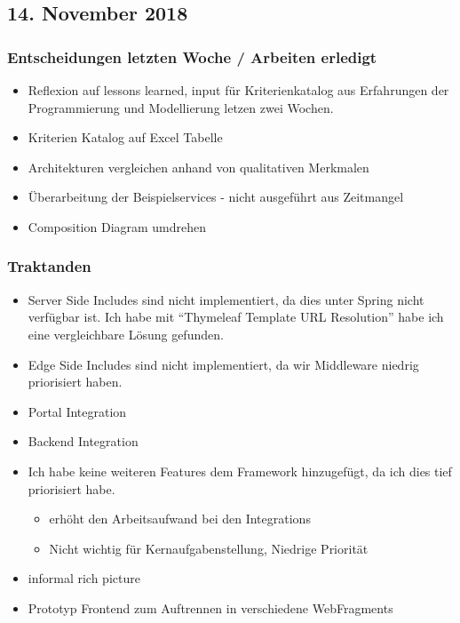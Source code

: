 \documentclass{article}
\begin{document}
    
\subsection{14. November 2018} \label{chap:Protokols:14nov2018}

\subsubsection{Entscheidungen letzten Woche / Arbeiten erledigt}
\begin{itemize}
    \item Reflexion auf lessons learned, input für Kriterienkatalog aus Erfahrungen der Programmierung und Modellierung letzen zwei Wochen.
    \item Kriterien Katalog auf Excel Tabelle \checkmark
    \item Architekturen vergleichen anhand von qualitativen Merkmalen 
    \item Überarbeitung der Beispielservices - nicht ausgeführt aus Zeitmangel
    \item Composition Diagram umdrehen \checkmark
\end{itemize}

\subsubsection{Traktanden}
\begin{itemize}
    \item Server Side Includes sind nicht implementiert, da dies unter Spring nicht verfügbar ist. Ich habe mit ``Thymeleaf Template URL Resolution'' habe ich eine vergleichbare Lösung gefunden.
    \item Edge Side Includes sind nicht implementiert, da wir Middleware niedrig priorisiert haben.
    \item Portal Integration
    \item Backend Integration
    \item Ich habe keine weiteren Features dem Framework hinzugefügt, da ich dies tief priorisiert habe.
    \begin{itemize}
        \item erhöht den Arbeitsaufwand bei den Integrations
        \item Nicht wichtig für Kernaufgabenstellung, Niedrige Priorität
    \end{itemize}
    \item informal rich picture 
    \item Prototyp Frontend zum Auftrennen in verschiedene WebFragments
\end{itemize}
\end{document}
